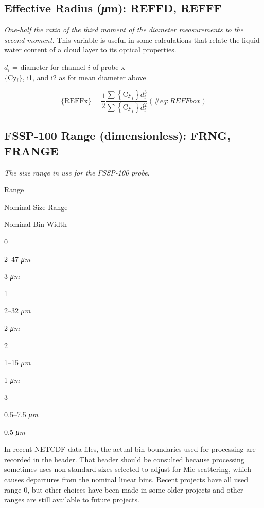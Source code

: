 \documentclass[
  english,
]{book}
\begin{document}
\hypertarget{effective-radius}{%
\subsection*{\texorpdfstring{Effective Radius ({\emph{μ}}m): REFFD,
REFFF}{Effective Radius (μm): REFFD, REFFF}}\label{effective-radius}}

\emph{One-half the ratio of the third moment of the diameter
measurements to the second moment.} This variable is useful in some
calculations that relate the liquid water content of a cloud layer to
its optical properties.

\(d_{i}\) = diameter for channel \(i\) of probe x\\
\{Cy\(_{i}\)\}, i1, and i2 as for mean diameter above

\begin{equation}
\mathrm{\{REFFx\}}=\frac{1}{2}\frac{\sum{\displaystyle {\displaystyle \left\{ \mathrm{Cy}_{i}\right\} d_{i}^{3}}}}{\sum{\displaystyle {\displaystyle \left\{ \mathrm{Cy}_{i}\right\} d_{i}^{2}}}}
(\#eq:REFFbox)
\end{equation}

\hypertarget{fssp-range}{%
\subsection*{FSSP-100 Range (dimensionless): FRNG,
FRANGE}\label{fssp-range}}

\emph{The size range in use for the FSSP-100} \emph{probe}.

Range

Nominal Size Range

Nominal Bin Width

0

2--47 {\emph{μm}}

3 {\emph{μm}}

1

2--32 {\emph{μm}}

2 {\emph{μm}}

2

1--15 {\emph{μm}}

1 {\emph{μm}}

3

0.5--7.5 {\emph{μm}}

0.5 {\emph{μm}}

In recent NETCDF data files, the actual bin boundaries used for
processing are recorded in the header. That header should be consulted
because processing sometimes uses non-standard sizes selected to adjust
for Mie scattering, which causes departures from the nominal linear
bins. Recent projects have all used range 0, but other choices have been
made in some older projects and other ranges are still available to
future projects.
\end{document}
